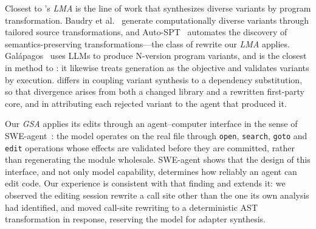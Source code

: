 
Closest to \sys's \emph{LMA} is the line of work that synthesizes diverse
variants by program transformation. Baudry et al.~\cite{baudry2014tailored}
generate computationally diverse variants through tailored source
transformations, and Auto-SPT~\cite{hooda2025autospt} automates the discovery
of semantics-preserving transformations---the class of rewrite our \emph{LMA}
applies. Gal\'apagos~\cite{ron2024galapagos} uses LLMs to produce N-version
program variants, and is the closest in method to \sys: it likewise treats
generation as the objective and validates variants by execution. \sys differs
in coupling variant synthesis to a dependency substitution, so that divergence
arises from both a changed library and a rewritten first-party core, and in
attributing each rejected variant to the agent that produced it.


Our \emph{GSA} applies its edits through an agent--computer interface in the
sense of SWE-agent~\cite{yang2024sweagent}: the model operates on the real file
through \texttt{open}, \texttt{search}, \texttt{goto} and \texttt{edit}
operations whose effects are validated before they are committed, rather than
regenerating the module wholesale. SWE-agent shows that the design of this
interface, and not only model capability, determines how reliably an agent can
edit code. Our experience is consistent with that finding and extends it: we
observed the editing session rewrite a call site other than the one its own
analysis had identified, and moved call-site rewriting to a deterministic AST
transformation in response, reserving the model for adapter synthesis.
